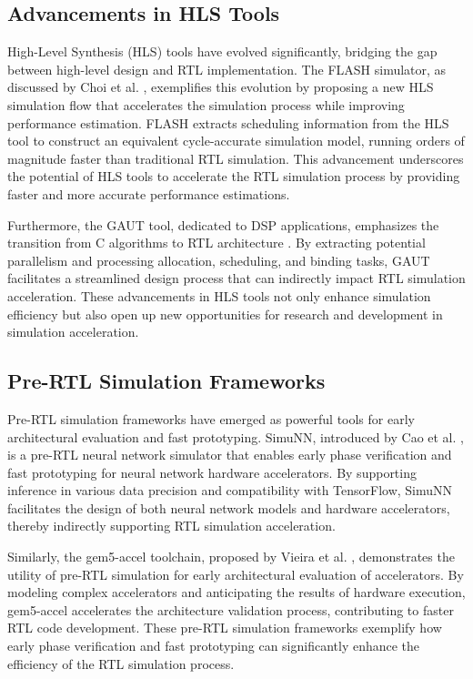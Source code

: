 \documentclass[conference]{IEEEtran}
\begin{document}
\subsection{Advancements in HLS Tools}

High-Level Synthesis (HLS) tools have evolved significantly, bridging the gap between high-level design and RTL implementation. The FLASH simulator, as discussed by Choi et al. \cite{choiFLASHFastParallel2020}, exemplifies this evolution by proposing a new HLS simulation flow that accelerates the simulation process while improving performance estimation. FLASH extracts scheduling information from the HLS tool to construct an equivalent cycle-accurate simulation model, running orders of magnitude faster than traditional RTL simulation. This advancement underscores the potential of HLS tools to accelerate the RTL simulation process by providing faster and more accurate performance estimations.

Furthermore, the GAUT tool, dedicated to DSP applications, emphasizes the transition from C algorithms to RTL architecture \cite{coussyGAUTHighLevelSynthesis2008a}. By extracting potential parallelism and processing allocation, scheduling, and binding tasks, GAUT facilitates a streamlined design process that can indirectly impact RTL simulation acceleration. These advancements in HLS tools not only enhance simulation efficiency but also open up new opportunities for research and development in simulation acceleration.

\subsection{Pre-RTL Simulation Frameworks}

Pre-RTL simulation frameworks have emerged as powerful tools for early architectural evaluation and fast prototyping. SimuNN, introduced by Cao et al. \cite{caoSimuNNPreRTLInference2020}, is a pre-RTL neural network simulator that enables early phase verification and fast prototyping for neural network hardware accelerators. By supporting inference in various data precision and compatibility with TensorFlow, SimuNN facilitates the design of both neural network models and hardware accelerators, thereby indirectly supporting RTL simulation acceleration.

Similarly, the gem5-accel toolchain, proposed by Vieira et al. \cite{vieiraGem5accelPreRTLSimulation2024}, demonstrates the utility of pre-RTL simulation for early architectural evaluation of accelerators. By modeling complex accelerators and anticipating the results of hardware execution, gem5-accel accelerates the architecture validation process, contributing to faster RTL code development. These pre-RTL simulation frameworks exemplify how early phase verification and fast prototyping can significantly enhance the efficiency of the RTL simulation process.
\end{document}
